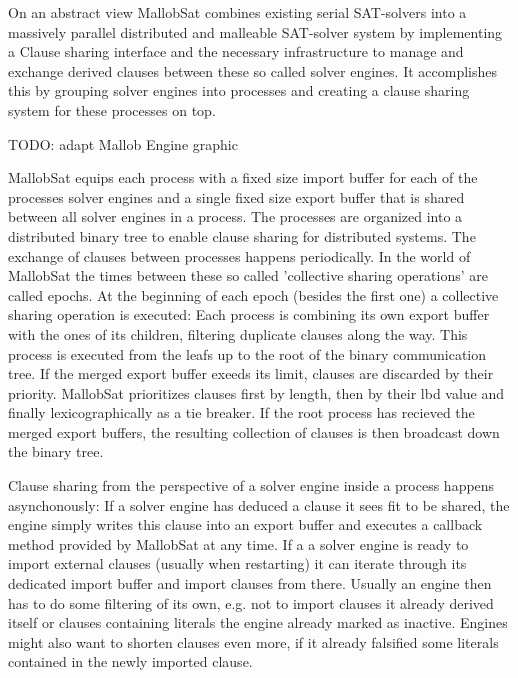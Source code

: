 \documentclass[12pt,a4paper,twoside]{scrartcl}
\numberwithin{equation}{section}
\begin{document}
On an abstract view MallobSat combines existing serial SAT-solvers into a massively parallel distributed and malleable SAT-solver system by implementing a Clause sharing interface and the necessary infrastructure to manage and exchange derived clauses between these so called solver engines. It accomplishes this by grouping solver engines into processes and creating a clause sharing system for these processes on top.

TODO: adapt Mallob Engine graphic

MallobSat equips each process with a fixed size import buffer for each of the processes solver engines and a single fixed size export buffer that is shared between all solver engines in a process. The processes are organized into a distributed binary tree to enable clause sharing for distributed systems. The exchange of clauses between processes happens periodically. In the world of MallobSat the times between these so called 'collective sharing operations' are called epochs.
At the beginning of each epoch (besides the first one) a collective sharing operation is executed: Each process is combining its own export buffer with the ones of its children, filtering duplicate clauses along the way. This process is executed from the leafs up to the root of the binary communication tree. If the merged export buffer exeeds its limit, clauses are discarded by their priority. MallobSat prioritizes clauses first by length, then by their lbd value and finally lexicographically as a tie breaker. If the root process has recieved the merged export buffers, the resulting collection of clauses is then broadcast down the binary tree.

Clause sharing from the perspective of a solver engine inside a process happens asynchonously: If a solver engine has deduced a clause it sees fit to be shared, the engine simply writes this clause into an export buffer and executes a callback method provided by MallobSat at any time. If a a solver engine is ready to import external clauses (usually when restarting) it can iterate through its dedicated import buffer and import clauses from there. Usually an engine then has to do some filtering of its own, e.g. not to import clauses it already derived itself or clauses containing literals the engine already marked as inactive. Engines might also want to shorten clauses even more, if it already falsified some literals contained in the newly imported clause.
\end{document}
